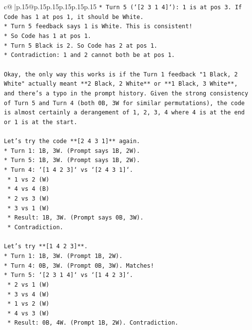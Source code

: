 \documentclass{article}
\begin{document}
{\begin{supertabular}{c@{$\;$}|p{.15\linewidth}@{}p{.15\linewidth}p{.15\linewidth}p{.15\linewidth}p{.15\linewidth}p{.15\linewidth}}
{{{\texttt{*   Turn 5 (`{[}2 3 1 4{]}`): 1 is at pos 3. If Code has 1 at pos 1, it should be White.} \\
\texttt{*   Turn 5 feedback says 1 is White. This is consistent!} \\
\texttt{*   So Code has 1 at pos 1.} \\
\texttt{*   Turn 5 Black is 2. So Code has 2 at pos 1.} \\
\texttt{*   Contradiction: 1 and 2 cannot both be at pos 1.} \\
\\ 
\texttt{Okay, the only way this works is if the Turn 1 feedback "1 Black, 2 White" actually meant **2 Black, 2 White** or **1 Black, 3 White**, and there's a typo in the prompt history. Given the strong consistency of Turn 5 and Turn 4 (both 0B, 3W for similar permutations), the code is almost certainly a derangement of 1, 2, 3, 4 where 4 is at the end or 1 is at the start.} \\
\\ 
\texttt{Let's try the code **{[}2 4 3 1{]}** again.} \\
\texttt{*   Turn 1: 1B, 3W. (Prompt says 1B, 2W).} \\
\texttt{*   Turn 5: 1B, 3W. (Prompt says 1B, 2W).} \\
\texttt{*   Turn 4: `{[}1 4 2 3{]}` vs `{[}2 4 3 1{]}`.} \\
\texttt{    *   1 vs 2 (W)} \\
\texttt{    *   4 vs 4 (B)} \\
\texttt{    *   2 vs 3 (W)} \\
\texttt{    *   3 vs 1 (W)} \\
\texttt{    *   Result: 1B, 3W. (Prompt says 0B, 3W).} \\
\texttt{    *   Contradiction.} \\
\\ 
\texttt{Let's try **{[}1 4 2 3{]}**.} \\
\texttt{*   Turn 1: 1B, 3W. (Prompt 1B, 2W).} \\
\texttt{*   Turn 4: 0B, 3W. (Prompt 0B, 3W). Matches!} \\
\texttt{*   Turn 5: `{[}2 3 1 4{]}` vs `{[}1 4 2 3{]}`.} \\
\texttt{    *   2 vs 1 (W)} \\
\texttt{    *   3 vs 4 (W)} \\
\texttt{    *   1 vs 2 (W)} \\
\texttt{    *   4 vs 3 (W)} \\
\texttt{    *   Result: 0B, 4W. (Prompt 1B, 2W). Contradiction.} \\
}}}
\end{supertabular}}
\end{document}
